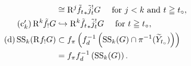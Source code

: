 \begin{Proposition+}
\begin{enumerate}[(i)]
\begin{align}
      &\cong
      \Rder[j]\tilde{f_{t}}_{\ast}\tilde{j}^{!}_{t}G
      \quad
      \text{ for \(j<k\) and \(t\geqq t_\circ\)},\\
      \tag{c\(_k'\)}
      \Rder[k]{\tilde{f}_{!}}G
      &\hookrightarrow
      \Rder[k]\tilde{f_{t}}_{\ast}\tilde{j}^{!}_{t}G
      \quad
      \text{ for \(t\geqq t_\circ\)},\\
      \tag{d}
      \muS[k](\Rder[]{f_{!}}G)
      &\subset
      \mpb[f]\left(\mdiff[f]^{-1}\left(
        \muS[k](G)\cap \pi^{-1}(\widetilde{Y}_{t_{\circ}})
      \right)\right)\\
      \notag&=\mpb[f]\mdiff[f]^{-1}\left(
        \muS[k](G)
      \right).
    \end{align}
  \end{enumerate}
\end{Proposition+}

